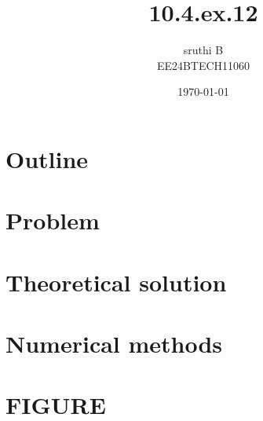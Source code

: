 \documentclass{beamer}
\title{10.4.ex.12}
\author{sruthi B \\ EE24BTECH11060\\}
\date{\today}
\theoremstyle{remark}
\numberwithin{equation}{section}
\begin{document}
\begin{frame}
\titlepage
\end{frame}

\section*{Outline}
\begin{frame}
\tableofcontents
\end{frame}
\section{Problem}
\section{Theoretical solution}
\section{Numerical methods}
\section{FIGURE}
\end{document}
